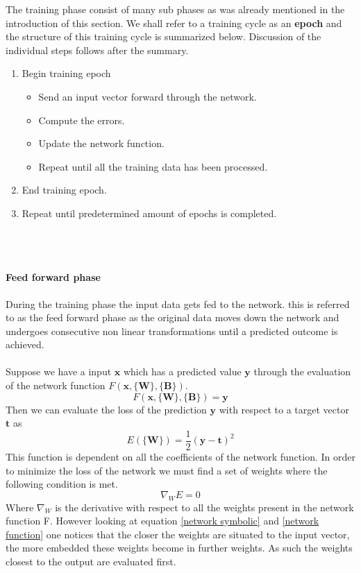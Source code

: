 \documentclass[12pt]{article}
\begin{document}
The training phase consist of many sub phases as was already mentioned in the introduction of this section. We shall refer to a training cycle as an \textbf{epoch} and the structure of this training cycle is summarized below. Discussion of the individual steps follows after the summary.
\begin{enumerate}
	\item Begin training epoch
	\begin{itemize}
		\item Send an input vector forward through the network.
		\item Compute the errors.
		\item Update the network function.
		\item Repeat until all the training data has been processed.
	\end{itemize}	
	\item End training epoch.
	\item Repeat until predetermined amount of epochs is completed.
\end{enumerate}
\\
\\
\paragraph{Feed forward phase}
During the training phase the input data gets fed to the network. this is referred to as the feed forward phase as the original data moves down the network and undergoes consecutive non linear transformations until a predicted outcome is achieved.  
\\
\\
Suppose we have a input $\textbf{x}$ which has a predicted value $\textbf{y}$ through the evaluation of the network function $F\left(\textbf{x}, \{\textbf{W}\}, \{\textbf{B}\} \right)$.
\begin{equation*}
F\left(\textbf{x}, \{\textbf{W}\}, \{\textbf{B}\} \right) = \textbf{y}
\end{equation*}
Then we can evaluate the loss of the prediction $\textbf{y}$ with respect to a target vector $\textbf{t}$ as \cite{Bishop2013} \cite{Hastie}
\begin{equation}
E\left(\{\textbf{W}\}\right) = \frac{1}{2} \left( \textbf{y} - \textbf{t} \right)^2
\end{equation}
This function is dependent on all the coefficients of the network function. In order to minimize the loss of the network we must find a set of weights where the following condition is met. 
\begin{equation}
\nabla_{W}E = 0
\end{equation}
Where $\nabla_{W}$ is the derivative with respect to all the weights present in the network function F. However looking at equation \ref{network symbolic} and \ref{network function} one notices that the closer the weights are situated to the input vector, the more embedded these weights become in further weights. As such the weights closest to the output are evaluated first. 
\end{document}
